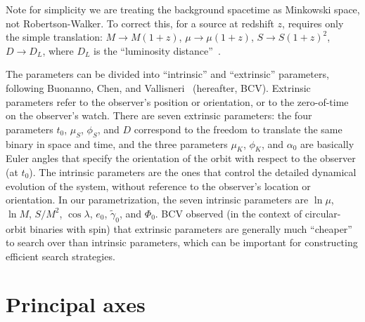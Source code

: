 \documentclass[11pt]{report}
\begin{document}
Note for simplicity we are treating the background spacetime as
Minkowski space, not Robertson-Walker. To correct this, for a source
at redshift $z$, requires only
the simple translation: $M\rightarrow M(1+z)$, $\mu\rightarrow \mu(1+z)$,
$S\rightarrow S(1+z)^2$, $D\rightarrow D_L$, where $D_L$ is the
``luminosity distance''~\cite{markovic}.

The parameters can be divided into ``intrinsic'' and ``extrinsic''
parameters, following  Buonanno, Chen, and
Vallisneri~\cite{BCV} (hereafter, BCV).
Extrinsic parameters refer to the observer's position or orientation, or to
the zero-of-time on the observer's watch.
There are seven extrinsic parameters: the four parameters
$t_0$,  $\mu_S$, $\phi_S$, and $D$ correspond to the
freedom to translate the same binary in space and time, and
the three parameters $\mu_K$, $\phi_K$, and $\alpha_0$ are
basically Euler angles that specify the orientation of the
orbit with respect to the observer (at $t_0$).
The intrinsic parameters are the ones that control the detailed
dynamical evolution of the system, without reference to the
observer's location or orientation.
In our parametrization, the seven intrinsic parameters are
$\ln\mu$, $\ln M$, $S/M^2$, $\cos\lambda$, $e_0$, $\tilde\gamma_0$,
and $\Phi_0$.
BCV observed (in the context of circular-orbit binaries with spin) that
extrinsic parameters are generally much ``cheaper'' to search over
than intrinsic parameters, which can be important for constructing
efficient search strategies.


\section{Principal axes}
\end{document}
